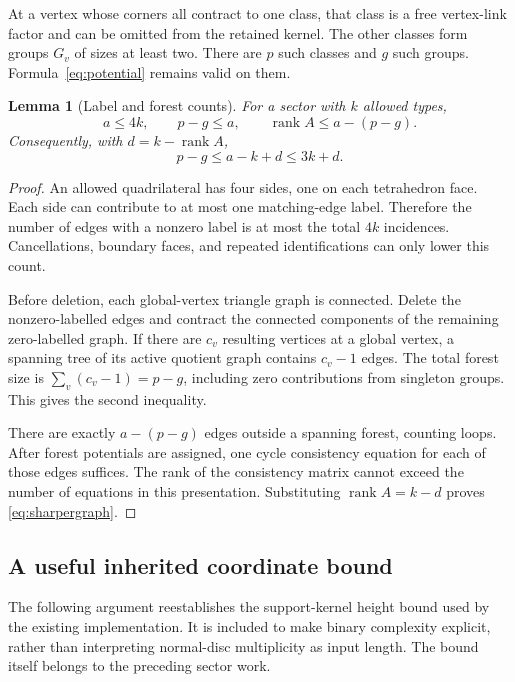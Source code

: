 \documentclass[11pt]{article}
\newtheorem{lemma}[theorem]{Lemma}
\theoremstyle{definition}
\theoremstyle{remark}
\newcommand{\rank}{\operatorname{rank}}
\begin{document}
At a vertex whose corners all contract to one class, that class is a free
vertex-link factor and can be omitted from the retained kernel. The other
classes form groups $G_v$ of sizes at least two. There are $p$ such classes
and $g$ such groups. Formula~\eqref{eq:potential} remains valid on them.

\begin{lemma}[Label and forest counts]
\label{lem:graphcounts}
For a sector with $k$ allowed types,
\begin{equation}
 a\le4k,\qquad p-g\le a,\qquad
 \rank A\le a-(p-g).
 \label{eq:graphcounts}
\end{equation}
Consequently, with $d=k-\rank A$,
\begin{equation}
 p-g\le a-k+d\le3k+d.
 \label{eq:sharpergraph}
\end{equation}
\end{lemma}

\begin{proof}
An allowed quadrilateral has four sides, one on each tetrahedron face. Each
side can contribute to at most one matching-edge label. Therefore the number
of edges with a nonzero label is at most the total $4k$ incidences. Cancellations,
boundary faces, and repeated identifications can only lower this count.

Before deletion, each global-vertex triangle graph is connected. Delete the
nonzero-labelled edges and contract the connected components of the remaining
zero-labelled graph. If there are $c_v$ resulting vertices at a global
vertex, a spanning tree of its active quotient graph contains $c_v-1$ edges.
The total forest size is $\sum_v(c_v-1)=p-g$, including zero contributions
from singleton groups. This gives the second inequality.

There are exactly $a-(p-g)$ edges outside a spanning forest, counting loops.
After forest potentials are assigned, one cycle consistency equation for each
of those edges suffices. The rank of the consistency matrix cannot exceed the
number of equations in this presentation. Substituting $\rank A=k-d$ proves
\eqref{eq:sharpergraph}.
\end{proof}

\subsection{A useful inherited coordinate bound}

The following argument reestablishes the support-kernel height bound used by
the existing implementation. It is included to make binary complexity
explicit, rather than interpreting normal-disc multiplicity as input length.
The bound itself belongs to the preceding sector work.\cite{report57}
\end{document}
